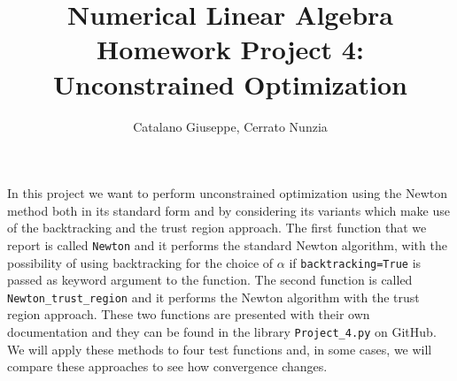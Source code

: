 \documentclass[a4paper,11pt]{article}
\begin{document}
	\author{Catalano Giuseppe, Cerrato Nunzia}
	\title{Numerical Linear Algebra Homework Project 4:\\Unconstrained Optimization}
	\date{}
	\maketitle
	
	\noindent In this project we want to perform unconstrained optimization using the Newton method both in its standard form and by considering its variants which make use of the backtracking and the trust region approach.
	The first function that we report is called \texttt{Newton} and it performs the standard Newton algorithm, with the possibility of using backtracking for the choice of $\alpha$ if \texttt{backtracking=True} is passed as keyword argument to the function. The second function is called \texttt{Newton_trust_region} and it performs the Newton algorithm with the trust region approach. These two functions are presented with their own documentation and they can be found in the library \texttt{Project_4.py} on GitHub.
	We will apply these methods to four test functions and, in some cases, we will compare these approaches to see how convergence changes.
	
\end{document}
